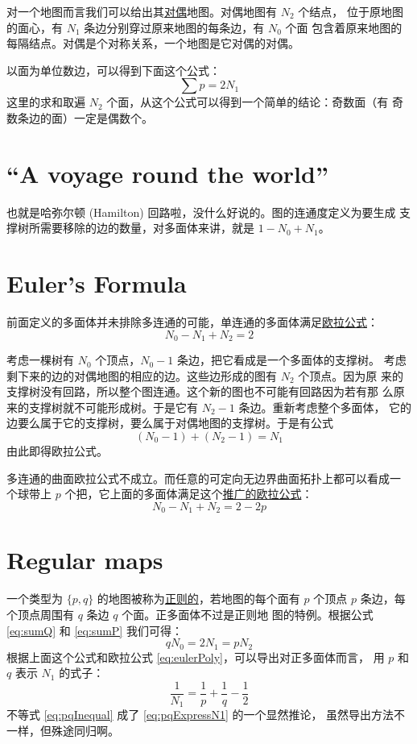\documentclass[cs4size,a4paper,adobefonts,openany]{ctexbook}
\newcommand{\pname}[1]{\underline{#1}}
\numberwithin{equation}{section}
\begin{document}
对一个地图而言我们可以给出其\pname{对偶}地图。对偶地图有 $N_2$ 个结点，
位于原地图的面心，有 $N_1$ 条边分别穿过原来地图的每条边，有 $N_0$ 个面
包含着原来地图的每隔结点。对偶是个对称关系，一个地图是它对偶的对偶。

以面为单位数边，可以得到下面这个公式：
\begin{equation}
  \label{eq:sumP}
  \sum p = 2N_1
\end{equation}
这里的求和取遍 $N_2$ 个面，从这个公式可以得到一个简单的结论：奇数面（有
  奇数条边的面）一定是偶数个。

\section{``A voyage round the world''}
也就是哈弥尔顿 (Hamilton) 回路啦，没什么好说的。图的连通度定义为要生成
支撑树所需要移除的边的数量，对多面体来讲，就是 $1-N_0+N_1$。

\section{Euler's Formula}
前面定义的多面体并未排除多连通的可能，单连通的多面体满足\pname{欧拉公式}：
\begin{equation}
  \label{eq:eulerPoly}
  N_0-N_1+N_2=2
\end{equation}

考虑一棵树有 $N_0$ 个顶点，$N_0-1$ 条边，把它看成是一个多面体的支撑树。
考虑剩下来的边的对偶地图的相应的边。这些边形成的图有 $N_2$ 个顶点。因为原
来的支撑树没有回路，所以整个图连通。这个新的图也不可能有回路因为若有那
么原来的支撑树就不可能形成树。于是它有 $N_2-1$ 条边。重新考虑整个多面体，
它的边要么属于它的支撑树，要么属于对偶地图的支撑树。于是有公式
\[
(N_0-1)+(N_2-1) = N_1
\]
由此即得欧拉公式。

多连通的曲面欧拉公式不成立。而任意的可定向无边界曲面拓扑上都可以看成一
个球带上 $p$ 个把，它上面的多面体满足这个\pname{推广的欧拉公式}：
\begin{equation}
N_0 - N_1 + N_2 = 2 - 2p  
\end{equation}

\section{Regular maps}
一个类型为 $\{p, q\}$ 的地图被称为\pname{正则的}，若地图的每个面有 $p$
个顶点 $p$ 条边，每个顶点周围有 $q$ 条边 $q$ 个面。正多面体不过是正则地
图的特例。根据公式 \eqref{eq:sumQ} 和 \eqref{eq:sumP} 我们可得：
\begin{equation}
  qN_0 = 2N_1 = pN_2
\end{equation}
根据上面这个公式和欧拉公式 \eqref{eq:eulerPoly}，可以导出对正多面体而言，
用 $p$ 和 $q$ 表示 $N_1$ 的式子：
\begin{equation}
  \label{eq:pqExpressN1}
  \frac{1}{N_1} = \frac{1}{p}+\frac{1}{q}-\frac{1}{2}
\end{equation}
不等式 \eqref{eq:pqInequal} 成了 \eqref{eq:pqExpressN1} 的一个显然推论，
虽然导出方法不一样，但殊途同归啊。
\end{document}
